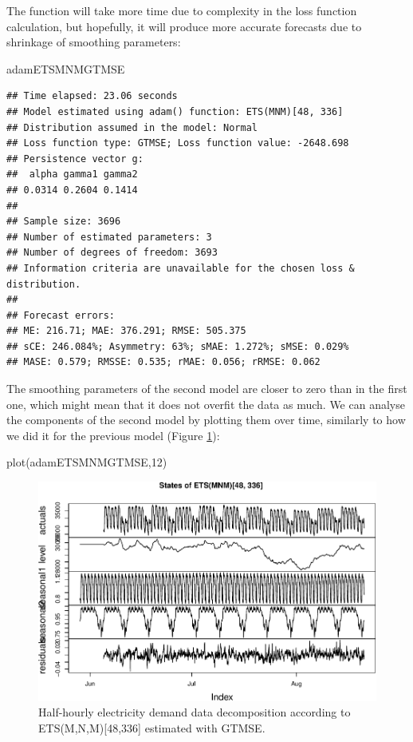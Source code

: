 \documentclass[
]{book}
\newenvironment{Shaded}{\begin{snugshade}}{\end{snugshade}}
\newcommand{\DecValTok}[1]{\textcolor[rgb]{0.00,0.00,0.81}{#1}}
\newcommand{\FunctionTok}[1]{\textcolor[rgb]{0.00,0.00,0.00}{#1}}
\newcommand{\NormalTok}[1]{#1}
\theoremstyle{definition}
\theoremstyle{definition}
\theoremstyle{definition}
\theoremstyle{definition}
\theoremstyle{remark}
\begin{document}
The function will take more time due to complexity in the loss function calculation, but hopefully, it will produce more accurate forecasts due to shrinkage of smoothing parameters:

\begin{Shaded}
\begin{Highlighting}[]
\NormalTok{adamETSMNMGTMSE}
\end{Highlighting}
\end{Shaded}

\begin{verbatim}
## Time elapsed: 23.06 seconds
## Model estimated using adam() function: ETS(MNM)[48, 336]
## Distribution assumed in the model: Normal
## Loss function type: GTMSE; Loss function value: -2648.698
## Persistence vector g:
##  alpha gamma1 gamma2 
## 0.0314 0.2604 0.1414 
## 
## Sample size: 3696
## Number of estimated parameters: 3
## Number of degrees of freedom: 3693
## Information criteria are unavailable for the chosen loss & distribution.
## 
## Forecast errors:
## ME: 216.71; MAE: 376.291; RMSE: 505.375
## sCE: 246.084%; Asymmetry: 63%; sMAE: 1.272%; sMSE: 0.029%
## MASE: 0.579; RMSSE: 0.535; rMAE: 0.056; rRMSE: 0.062
\end{verbatim}

The smoothing parameters of the second model are closer to zero than in the first one, which might mean that it does not overfit the data as much. We can analyse the components of the second model by plotting them over time, similarly to how we did it for the previous model (Figure \ref{fig:adamModelETSMNMGTMSE12}):

\begin{Shaded}
\begin{Highlighting}[]
\FunctionTok{plot}\NormalTok{(adamETSMNMGTMSE,}\DecValTok{12}\NormalTok{)}
\end{Highlighting}
\end{Shaded}

\begin{figure}
\centering
\includegraphics{Svetunkov--2022----ADAM_files/figure-latex/adamModelETSMNMGTMSE12-1.pdf}
\caption{\label{fig:adamModelETSMNMGTMSE12}Half-hourly electricity demand data decomposition according to ETS(M,N,M){[}48,336{]} estimated with GTMSE.}
\end{figure}
\end{document}
